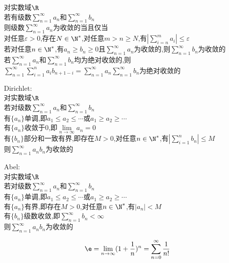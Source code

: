 \begin{dingli}
对实数域$\R$\\
若有级数$\sum\limits_{n=1}^{\infty}a_n$和$\sum\limits_{n=1}^{\infty}b_n$\\
则级数$\sum\limits_{n=1}^{\infty}a_n$为收敛的当且仅当\\
对任意$\varepsilon>0$,存在$N\in\N^*$,对任意$m>n\geq N$,有$|\sum\limits_{i=n}^{m}a_i|\leq \varepsilon$\\
若对任意$n\in\N^*$,有$a_n\geq b_n\geq 0$且$\sum\limits_{n=1}^{\infty}a_n$为收敛的,则$\sum\limits_{n=1}^{\infty}b_n$为收敛的\\
若$\sum\limits_{n=1}^{\infty}a_n$和$\sum\limits_{n=1}^{\infty}b_n$均为绝对收敛的,则$\sum\limits_{n=1}^{\infty}\sum\limits_{i=1}^{n}a_{i}b_{n+1-i}=\sum\limits_{n=1}^{\infty}a_n\sum\limits_{n=1}^{\infty}b_n$为绝对收敛的
\end{dingli}

\begin{dingli}
Dirichlet:\\
对实数域$\R$\\
若对级数$\sum\limits_{n=1}^{\infty}a_n$和$\sum\limits_{n=1}^{\infty}b_n$\\
有$\{a_n\}$单调,即$a_1\leq a_2\leq \cdots$或$a_1\geq a_2\geq \cdots$\\
有$\{a_n\}$收敛于$0$,即$\lim\limits_{n\to\infty}a_n=0$\\
有$\{b_n\}$部分和一致有界,即存在$M>0$,对任意$n\in\N^*$,有$|\sum\limits_{i=1}^{n}b_n|\leq M$\\
则$\sum\limits_{n=1}^{\infty}a_nb_n$为收敛的
\end{dingli}

\begin{dingli}
Abel:\\
对实数域$\R$\\
若对级数$\sum\limits_{n=1}^{\infty}a_n$和$\sum\limits_{n=1}^{\infty}b_n$\\
有$\{a_n\}$单调,即$a_1\leq a_2\leq \cdots$或$a_1\geq a_2\geq \cdots$\\
有$\{a_n\}$有界,即存在$M>0$,对任意$n\in \N^*$,有$|a_n|<M$\\
有$\{b_n\}$级数收敛,即$\sum\limits_{n=1}^{\infty}b_n<\infty$\\
则$\sum\limits_{n=1}^{\infty}a_nb_n$为收敛的
\end{dingli}

\begin{dingli}
\[\e=\lim\limits_{n\to\infty}(1+\frac{1}{n})^{n}=\sum\limits_{n=0}^{\infty}\frac{1}{n!}\]
\end{dingli}

